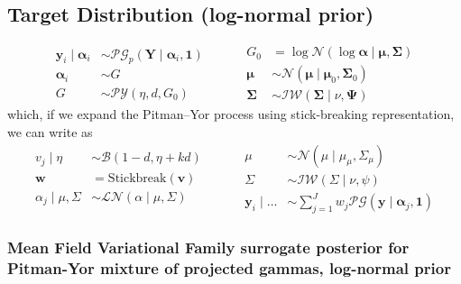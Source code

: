 \subsection{Target Distribution (log-normal prior)}
\begin{equation}
    \begin{aligned}
        \bm{y}_i \mid \bm{\alpha}_i &\sim 
            \mathcal{PG}_p\left(\bm{Y}\mid\bm{\alpha}_{i},\bm{1}\right)\\
        \bm{\alpha}_i &\sim G\\
        G &\sim \mathcal{PY}\left(\eta, d, G_0\right)
    \end{aligned}
    ~\hspace{1cm}
    \begin{aligned}
        G_0 &= \log\mathcal{N}(\log\bm{\alpha}\mid \bm{\mu}, \bm{\Sigma})\\
        \bm{\mu} &\sim \mathcal{N}\left(\bm{\mu}\mid \bm{\mu}_0, \bm{\Sigma}_0\right)\\
        \bm{\Sigma} &\sim \mathcal{IW}\left(\bm{\Sigma}\mid\nu,\bm{\Psi}\right)
    \end{aligned}
\end{equation}
which, if we expand the Pitman--Yor process using stick-breaking representation, we can write as
\begin{equation}
    \begin{aligned}
        v_j \mid \eta &\sim \mathcal{B}(1 - d, \eta + kd)\\
        \bm{w} &= \text{Stickbreak}(\bm{v})\\
        \alpha_j\mid\mu,\Sigma &\sim \mathcal{LN}(\alpha\mid\mu,\Sigma)
    \end{aligned}
    ~\hspace{1cm}
    \begin{aligned}
        \mu &\sim\mathcal{N}(\mu\mid\mu_{\mu},\Sigma_{\mu})\\
        \Sigma &\sim \mathcal{IW}(\Sigma\mid\nu, \psi)\\
        \bm{y}_i\mid\ldots &\sim {\textstyle\sum}_{j = 1}^Jw_j\mathcal{PG}(\bm{y}\mid\bm{\alpha}_j,\bm{1})
    \end{aligned}
\end{equation}

\subsubsection{Mean Field Variational Family surrogate posterior for Pitman-Yor mixture of projected gammas, log-normal prior}

